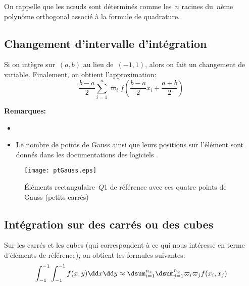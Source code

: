 On rappelle que les nœuds sont déterminés comme les~$n$ racines du~$n$ème 
polynôme orthogonal associé à la formule de quadrature.

\medskip
{}

\medskip
\subsection*{Changement d'intervalle d'intégration}

Si on intègre sur~$(a,b)$ au lieu de~$(-1,1)$, alors on fait un changement de
variable.
Finalement, on obtient l'approximation:
\begin{equation}  \frac{b-a}{2} \sum_{i=1}^n \varpi_i f\left(\frac{b-a}{2}x_i + \frac{a+b}{2}\right) \end{equation}

\medskip
\textbf{Remarques:}
\begin{itemize}
\item {}
\item Le nombre de points de Gauss ainsi que leurs positions sur l'élément sont donnés dans 
les documentations des logiciels .
\end{itemize}

\begin{figure}[ht]
\centering
\texttt{[image: ptGauss.eps]}
\caption{Éléments rectangulaire~$Q$1 de référence avec ces quatre points de Gauss (petits carrés)}\label{ptGauss}
\end{figure}

\medskip
\subsection*{Intégration sur des carrés ou des cubes}

Sur les carrés et les cubes (qui correspondent à ce qui nous intéresse en terme
d'éléments de référence), on obtient les formules suivantes:
\begin{equation} \int_{-1}^{-1}\int_{-1}^{-1} f(x,y)\dd x\dd y \approx
\dsum_{i=1}^{n_x}\dsum_{j=1}^{n_y} \varpi_i\varpi_j f(x_i,x_j)\end{equation}

